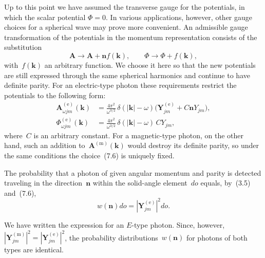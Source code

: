 Up to this point we have assumed the transverse gauge for the potentials, in which the scalar potential $\Phi = 0$. In various applications, however, other gauge choices for a spherical wave may prove more convenient.
An admissible gauge transformation of the potentials in the momentum representation consists of the substitution
\[
\mathbf{A} \to \mathbf{A} + \mathbf{n}f(\mathbf{k}), \qquad \Phi \to \Phi + f(\mathbf{k}),
\]
with~$f(\mathbf{k})$ an arbitrary function. We choose it here so that the new potentials are still expressed through the same spherical harmonics and continue to have definite parity. For an electric-type photon these requirements restrict the potentials to the following form:
\begin{equation}
\begin{aligned}
\mathbf{A}_{\omega jm}^{(\text{e})}(\mathbf{k}) &= \frac{4\pi^2}{\omega^{3/2}}\,\delta(|\mathbf{k}| - \omega)\bigl(\mathbf{Y}_{jm}^{(\text{e})} + C\mathbf{n}Y_{jm}\bigr),\\
\Phi_{\omega jm}^{(\text{e})}(\mathbf{k}) &= \frac{4\pi^2}{\omega^{3/2}}\,\delta(|\mathbf{k}| - \omega)\,CY_{jm},
\end{aligned}
\tag{7.10}
\end{equation}
where~$C$ is an arbitrary constant. For a magnetic-type photon, on the other hand, such an addition to~$\mathbf{A}^{(\text{m})}(\mathbf{k})$ would destroy its definite parity, so under the same conditions the choice~(7.6) is uniquely fixed.

The probability that a photon of given angular momentum and parity is detected traveling in the direction~$\mathbf{n}$ within the solid-angle element~$do$ equals, by~(3.5) and~(7.6),
\begin{equation}
w(\mathbf{n})do = \left|\mathbf{Y}_{jm}^{(\text{e})}\right|^2 do.
\tag{7.11}
\end{equation}

We have written the expression for an $E$-type photon. Since, however, $\left|\mathbf{Y}_{jm}^{(\text{m})}\right|^2 = \left|\mathbf{Y}_{jm}^{(\text{e})}\right|^2$, the probability distributions~$w(\mathbf{n})$ for photons of both types are identical.

